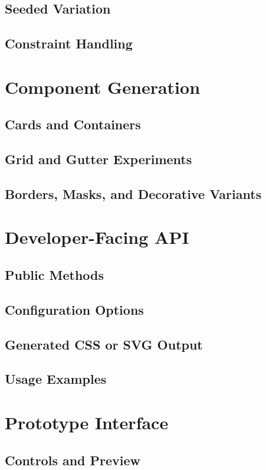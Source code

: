 \subsection{Seeded Variation}
\subsection{Constraint Handling}

\section{Component Generation}
\subsection{Cards and Containers}
\subsection{Grid and Gutter Experiments}
\subsection{Borders, Masks, and Decorative Variants}

\section{Developer-Facing API}
\subsection{Public Methods}
\subsection{Configuration Options}
\subsection{Generated CSS or SVG Output}
\subsection{Usage Examples}

\section{Prototype Interface}
\subsection{Controls and Preview}
